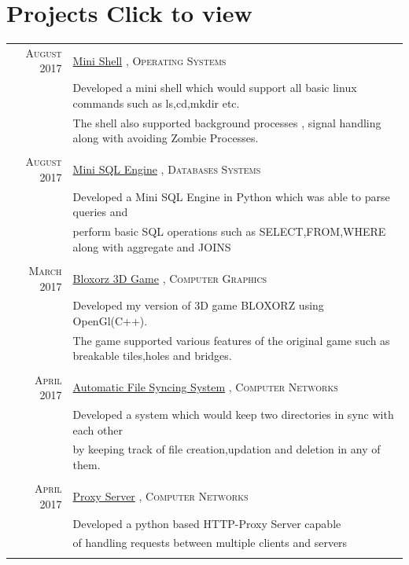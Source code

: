 \documentclass[a4paper,10pt]{article}
\begin{document}
\section{Projects \footnotesize{\footnotesize{Click to view}}}
\begin{tabular}{rl}	

\textsc{August} 2017 & \href{https://github.com/devanshmanu/Shell}{Mini Shell} , \textsc{Operating Systems}\\
& \footnotesize{Developed a mini shell which would support all basic linux commands such as ls,cd,mkdir etc.}\\
& \footnotesize{The shell also supported background processes , signal handling along with avoiding Zombie Processes.}\\\\



\textsc{August} 2017 & \href{https://github.com/devanshmanu/Mini-SQL-Engine}{Mini SQL Engine} , \textsc{Databases Systems}\\
& \footnotesize{Developed a Mini SQL Engine in Python which was able to parse queries and}\\
& \footnotesize{perform basic SQL operations such as SELECT,FROM,WHERE along with aggregate and JOINS}\\\\



\textsc{March} 2017 & \href{https://github.com/devanshmanu/bloxorz}{Bloxorz 3D Game} , \textsc{Computer Graphics}\\
& \footnotesize{Developed my version of 3D game BLOXORZ using OpenGl(C++).}\\
& \footnotesize{The game supported various features of the original game such as breakable tiles,holes and bridges.}\\\\

 \textsc{April} 2017 & \href{https://github.com/devanshmanu/Automatic-File-Syncing-System}{Automatic File Syncing System} , \textsc{Computer Networks}\\
& \footnotesize{Developed a system which would keep two directories in sync with each other}\\
& \footnotesize{by keeping track of file creation,updation and deletion in any of them.}\\\\


\textsc{April} 2017 & \href{https://github.com/devanshmanu/Proxy-Server}{Proxy Server} , \textsc{Computer Networks}\\
& \footnotesize{Developed a python based HTTP-Proxy Server capable}\\
& \footnotesize{ of handling requests between multiple clients and servers}\\\\



\end{tabular}
\end{document}
